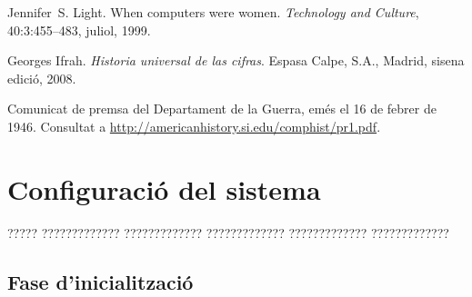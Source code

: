 \documentclass[11pt,catalan,listoffigures,listoftables]{tfgetsinf}
\begin{document}
\begin{thebibliography}{10}

   Jennifer~S. Light.
   \newblock When computers were women.
   \newblock \textit{Technology and Culture}, 40:3:455--483, juliol, 1999.

   Georges Ifrah.
   \newblock \textit{Historia universal de las cifras}.
   \newblock Espasa Calpe, S.A., Madrid, sisena edició, 2008.

   Comunicat de premsa del Departament de la Guerra, 
   emés el 16 de febrer de 1946. 
   \newblock Consultat a 
   \url{http://americanhistory.si.edu/comphist/pr1.pdf}.

\end{thebibliography}
\cleardoublepage


\APPENDIX


\chapter{Configuració del sistema}

????? ????????????? ????????????? ????????????? ????????????? ?????????????

\section{Fase d'inicialització}
\end{document}
